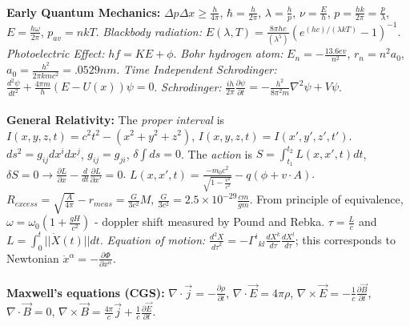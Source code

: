 \\
{\bf Early Quantum Mechanics:} $\Delta p \Delta x \geq {\frac {h} {4 \pi}}$,
$\hbar = {\frac {h}{2 \pi}}$,
$\lambda = {\frac {h}{p}}$,
$\nu = {\frac {E}{h}}$,
$p = {\frac { h k }{ 2 \pi }} = {\frac {p}{\lambda}}$,
$E = {\frac {h \omega}{2 \pi}}$,
$p_{av} = n k T$. \emph{Blackbody radiation:}
$E(\lambda , T ) = {\frac {8 \pi h c} {(\lambda^{5})}} (e^{{(h c)} /
{(\lambda k T )}}- 1)^{-1}$.  
\emph{Photoelectric Effect:} $hf= KE+ \phi$.
\emph{Bohr hydrogen atom:} $E_n = -{\frac {13.6 ev} {n^2}}$, $r_n=n^2a_0$,
$a_0= {\frac {h^2} {2 \pi k m c^2}}= .0529 nm$.
\emph{Time Independent Schrodinger:}
${\frac {d^2 \psi} {dt^2}}+{\frac {4 \pi m} {h}}(E-U(x)) \psi = 0$.
\emph{Schrodinger:}
${\frac {ih} {2 \pi}} {\frac {\partial \psi} {\partial t}} =
-{\frac {h^2} {8 \pi^2 m}} \nabla^2 \psi + V \psi$.
\\
\\
{\bf General Relativity:}
The \emph{proper interval} is $I(x,y,z,t)= c^2 t^2 - (x^2 + y^2 +z^2 )$, 
$I(x,y,z,t)=I(x',y',z',t')$.
$ds^{2}= g_{ij} dx^{i} dx^{j}$, $g_{ij} = g_{ji}$, $\delta \int {ds} = 0$.
The \emph{action} is $S= \int_{t_1}^{t_2} L(x, x', t) dt$, $\delta S=0 \rightarrow 
{\frac {\partial L} {\partial x}}- {\frac d {dt}} {\frac {\partial L} {\partial x'}}=0$.
$L(x,x',t)= {\frac {-m_0 c^2} {\sqrt {1-{\frac {v^2} {c^2}}}}} - q(\phi + v \cdot A)$.  
$R_{excess}= {\sqrt {\frac {A} {4 \pi}}} - r_{meas}= {\frac {G} {3 c^2}}M$,
${\frac {G} {3 c^2}}= 2.5 \times 10^{-29} {\frac {cm} {gm}}$.  From principle of
equivalence, $\omega= \omega_0 (1+ {\frac {gH} {c^2}})$ - doppler shift measured by 
Pound and Rebka. $\tau = {\frac L c}$ and $L = \int_0^t ||\dot{X}(t)|| dt$.
\emph{Equation of motion:} ${\frac {d^2 X} {{d \tau}^2}} = - {{\Gamma}^i}_{kl}
{\frac {d X^k} {d \tau}} {\frac {d X^l} {d \tau}}$; this corresponds to Newtonian
$\ddot{x}^{\alpha} = - {\frac {\partial \Phi} {\partial x^{\alpha}}}$.  
\\
\\
{\bf Maxwell's equations (CGS):}
$\nabla \cdot {\vec j} = - {\frac {\partial \rho} {\partial t}}$,
$\nabla \cdot {\vec E} =  4 \pi {\rho}$, 
$\nabla \times {\vec E} = - {\frac 1 c} {\frac {\partial {\vec B}}{\partial t}}$,
$\nabla \cdot {\vec B} = 0$,
$\nabla \times {\vec B} = {\frac {4 \pi} c} {\vec j} +
{\frac 1 c} {\frac {\partial {\vec E}} {\partial t}}$.
